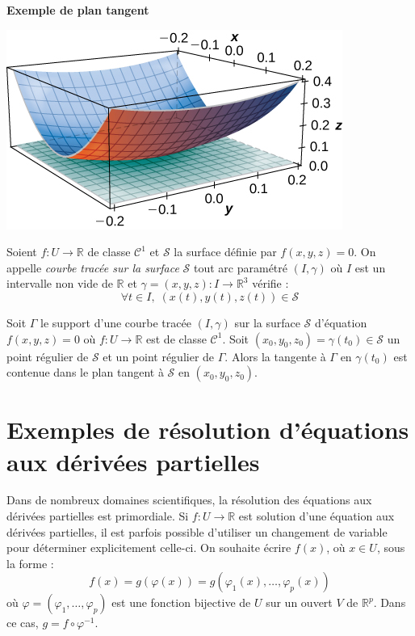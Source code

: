 \documentclass[a4paper,10pt]{report}
\begin{document}
\medskip

\begin{center}
\textbf{Exemple de plan tangent}
\end{center}

\begin{center}
\includegraphics[scale=1]{tan}
\end{center}

\begin{defin} Soient $f : U \rightarrow \mathbb{R}$ de classe $\mathcal{C}^1$ et $\mathcal{S}$ la surface définie par $f(x,y,z)=0$. On appelle \textit{courbe tracée sur la surface} $\mathcal{S}$ tout arc paramétré $(I, \gamma)$ où $I$ est un intervalle non vide de $\mathbb{R}$ et $ \gamma =(x,y,z) : I \rightarrow \mathbb{R}^3$ vérifie :
$$ \forall t \in I, \; (x(t),y(t),z(t)) \in \mathcal{S}$$
\end{defin}

\begin{prop} Soit $\Gamma$ le support d'une courbe tracée $(I, \gamma)$ sur la surface $\mathcal{S}$ d'équation $f(x,y,z)=0$ où $f : U \rightarrow \mathbb{R}$ est de classe $\mathcal{C}^1$.  Soit $(x_0,y_0,z_0)= \gamma(t_0)  \in \mathcal{S}$ un point régulier de $\mathcal{S}$ et un point régulier de $\Gamma$. Alors la tangente à $\Gamma$ en $\gamma(t_0)$ est contenue dans le plan tangent à $\mathcal{S}$ en $(x_0,y_0,z_0)$.
\end{prop}

%



\section{Exemples de résolution d'équations aux dérivées partielles}
\noindent Dans de nombreux domaines scientifiques, la résolution des équations aux dérivées partielles est primordiale. Si $f : U \rightarrow \mathbb{R}$ est solution d'une équation aux dérivées partielles, il est parfois possible d'utiliser un changement de variable pour déterminer explicitement celle-ci. On souhaite écrire $f(x)$, où $x \in U$, sous la forme :
$$ f(x) = g(\varphi(x)) = g(\varphi_1(x), \ldots, \varphi_p(x))$$
où $\varphi= (\varphi_1, \ldots, \varphi_p)$ est une fonction bijective de $U$ sur un ouvert $V$ de $\mathbb{R}^p$. Dans ce cas, $g = f \circ \varphi^{-1}$. 
\end{document}
